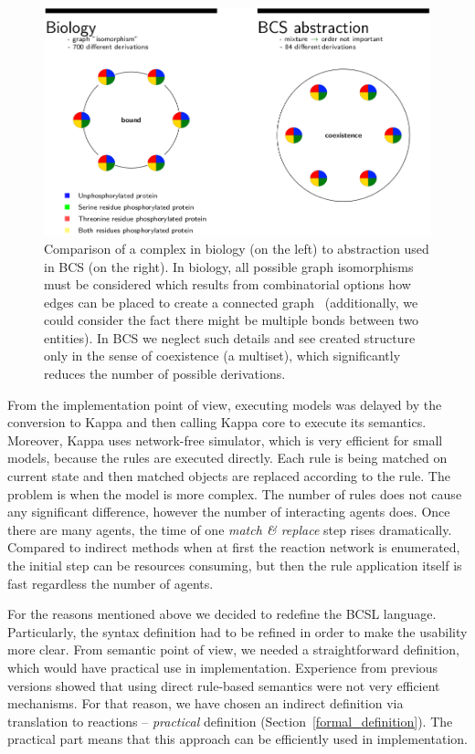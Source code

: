 \documentclass[12pt, twoside]{fithesis2} %
\begin{document}
\begin{figure}[!h]
\begin{center}
  \includegraphics[scale=0.35]{pics/abstraction}
\end{center}
\caption{Comparison of a complex in biology (on the left) to abstraction used in BCS (on the right). In biology, all possible graph isomorphisms must be considered which results from combinatorial options how edges can be placed to create a connected graph~\cite{Chartrand1985} (additionally, we could consider the fact there might be multiple bonds between two entities). In BCS we neglect such details and see created structure only in the sense of coexistence (a multiset), which significantly reduces the number of possible derivations.}\label{abstraction_comparision}
\end{figure}

From the implementation point of view, executing models was delayed by the conversion to Kappa and then calling Kappa core to execute its semantics. Moreover, Kappa uses network-free simulator, which is very efficient for small models, because the rules are executed directly. Each rule is being matched on current state and then matched objects are replaced according to the rule. The problem is when the model is more complex. The number of rules does not cause any significant difference, however the number of interacting agents does. Once there are many agents, the time of one \emph{match \& replace} step rises dramatically. Compared to indirect methods when at first the reaction network is enumerated, the initial step can be resources consuming, but then the rule application itself is fast regardless the number of agents.

For the reasons mentioned above we decided to redefine the BCSL language. Particularly, the syntax definition had to be refined in order to make the usability more clear. From semantic point of view, we needed a straightforward definition, which would have practical use in implementation. Experience from previous versions showed that using direct rule-based semantics were not very efficient mechanisms. For that reason, we have chosen an indirect definition via translation to reactions -- \emph{practical} definition (Section~\ref{formal_definition}). The practical part means that this approach can be efficiently used in implementation.
\end{document}
